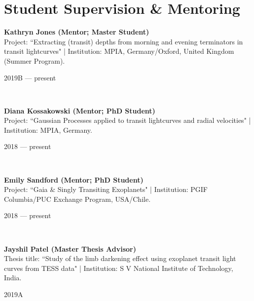 \documentclass[12pt, a4paper]{article} %
\begin{document}
\section*{Student Supervision \& Mentoring}
\begin{minipage}[t]{0.7\textwidth}
\begin{flushleft}%
  \setlength{\leftskip}{0.2cm}%
\textbf{Kathryn Jones (Mentor; Master Student)}\\
Project: ``Extracting (transit) depths from morning and evening terminators in transit lightcurves" | Institution: MPIA, Germany/Oxford, United Kingdom (Summer Program).
\end{flushleft}
\end{minipage}
\begin{minipage}[t]{0.3\textwidth}
\hfill 2019B --- present
\end{minipage}\\

\begin{minipage}[t]{0.7\textwidth}
\begin{flushleft}%
  \setlength{\leftskip}{0.2cm}%
\textbf{Diana Kossakowski (Mentor; PhD Student)}\\
Project: ``Gaussian Processes applied to transit lightcurves and radial velocities" | Institution: MPIA, Germany.
\end{flushleft}
\end{minipage}
\begin{minipage}[t]{0.3\textwidth}
\hfill 2018 --- present
\end{minipage}\\

\begin{minipage}[t]{0.7\textwidth}
\begin{flushleft}%
  \setlength{\leftskip}{0.2cm}%
\textbf{Emily Sandford (Mentor; PhD Student)}\\
Project: ``Gaia \& Singly Transiting Exoplanets" | Institution: PGIF Columbia/PUC Exchange Program, USA/Chile.
\end{flushleft}
\end{minipage}
\begin{minipage}[t]{0.3\textwidth}
\hfill 2018 --- present
\end{minipage}\\

\begin{minipage}[t]{0.7\textwidth}
\begin{flushleft}%
  \setlength{\leftskip}{0.2cm}%
\textbf{Jayshil Patel (Master Thesis Advisor)}\\
Thesis title: ``Study of the limb darkening effect using exoplanet transit light curves from TESS data" | Institution: S V National Institute of Technology, India.
\end{flushleft}
\end{minipage}
\begin{minipage}[t]{0.3\textwidth}
\hfill 2019A
\end{minipage}\\
\end{document}
